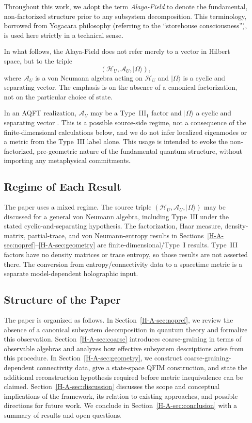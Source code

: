 \documentclass[12pt,a4paper,openany]{book}
\begin{document}
Throughout this work, we adopt the term \emph{Alaya-Field} to denote the fundamental, non-factorized structure prior to any subsystem decomposition.
This terminology, borrowed from Yogācāra philosophy (referring to the ``storehouse consciousness''), is used here strictly in a technical sense.

In what follows, the Alaya-Field does not refer merely to a vector in Hilbert space, but to the triple
\[
(\mathcal{H}_U, \mathcal{A}_U, |\Omega\rangle),
\]
where $\mathcal{A}_U$ is a von Neumann algebra acting on $\mathcal{H}_U$ and $|\Omega\rangle$ is a cyclic and separating vector.
The emphasis is on the absence of a canonical factorization, not on the particular choice of state.

In an AQFT realization, $\mathcal A_U$ may be a Type~III$_1$ factor and $|\Omega\rangle$ a cyclic and separating vector \cite{Haag1996}.  This is a possible source-side regime, not a consequence of the finite-dimensional calculations below, and we do not infer localized eigenmodes or a metric from the Type~III label alone.
This usage is intended to evoke the non-factorized, pre-geometric nature of the fundamental quantum structure, without importing any metaphysical commitments.

\subsection{Regime of Each Result}

The paper uses a mixed regime.  The source triple $(\mathcal H_U,\mathcal A_U,|\Omega\rangle)$ may be discussed for a general von Neumann algebra, including Type~III under the stated cyclic-and-separating hypothesis.  The factorization, Haar measure, density-matrix, partial-trace, and von Neumann-entropy results in Sections~\ref{H-A-sec:nopref}--\ref{H-A-sec:geometry} are finite-dimensional/Type~I results.  Type~III factors have no density matrices or trace entropy, so those results are not asserted there.  The conversion from entropy/connectivity data to a spacetime metric is a separate model-dependent holographic input.

\subsection{Structure of the Paper}

The paper is organized as follows.
In Section~\ref{H-A-sec:nopref}, we review the absence of a canonical subsystem decomposition in quantum theory and formalize this observation.
Section~\ref{H-A-sec:coarse} introduces coarse-graining in terms of observable algebras and analyzes how effective subsystem descriptions arise from this procedure.
In Section~\ref{H-A-sec:geometry}, we construct coarse-graining-dependent connectivity data, give a state-space QFIM construction, and state the additional reconstruction hypothesis required before metric inequivalence can be claimed.
Section~\ref{H-A-sec:discussion} discusses the scope and conceptual implications of the framework, its relation to existing approaches, and possible directions for future work.
We conclude in Section~\ref{H-A-sec:conclusion} with a summary of results and open questions.
\end{document}
